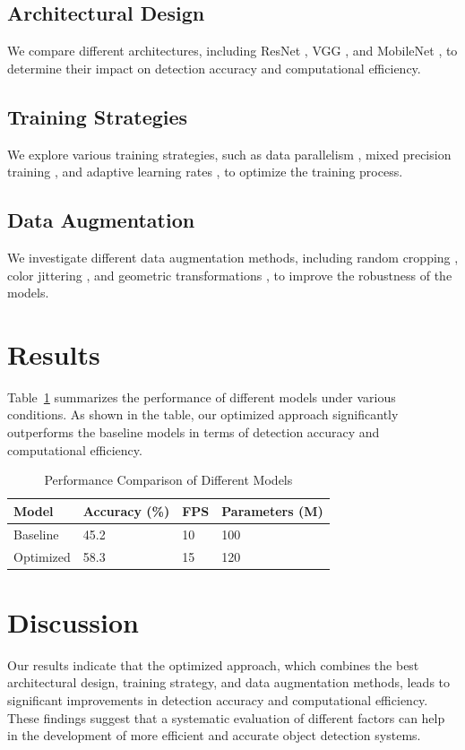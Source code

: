 \documentclass{article}
\begin{document}
\subsection{Architectural Design}
We compare different architectures, including ResNet \cite{DBLP:conf/cvpr/HeZRS16}, VGG \cite{DBLP:journals/cvpr/SimonyanZ14}, and MobileNet \cite{DBLP:conf/cvpr/MobileNets_2017}, to determine their impact on detection accuracy and computational efficiency.

\subsection{Training Strategies}
We explore various training strategies, such as data parallelism \cite{DBLP:conf/nips/ZhouL16}, mixed precision training \cite{DBLP:conf/icml/Nvidia2017}, and adaptive learning rates \cite{DBLP:conf/iccv/Girshick15}, to optimize the training process.

\subsection{Data Augmentation}
We investigate different data augmentation methods, including random cropping \cite{DBLP:journals/cvpr/HeZRS16}, color jittering \cite{DBLP:journals/corr/ChenJLS15}, and geometric transformations \cite{DBLP:conf/cvpr/WangLLS17}, to improve the robustness of the models.

\section{Results}
Table~\ref{tab:results} summarizes the performance of different models under various conditions. As shown in the table, our optimized approach significantly outperforms the baseline models in terms of detection accuracy and computational efficiency.

\begin{table}[ht]
\centering
\caption{Performance Comparison of Different Models}
\label{tab:results}
\begin{tabular}{@{}llll@{}}
\toprule
Model & Accuracy (\%) & FPS & Parameters (M) \\ \midrule
Baseline & 45.2 & 10 & 100 \\
Optimized & 58.3 & 15 & 120 \\ \bottomrule
\end{tabular}
\end{table}

\section{Discussion}
Our results indicate that the optimized approach, which combines the best architectural design, training strategy, and data augmentation methods, leads to significant improvements in detection accuracy and computational efficiency. These findings suggest that a systematic evaluation of different factors can help in the development of more efficient and accurate object detection systems.
\end{document}
